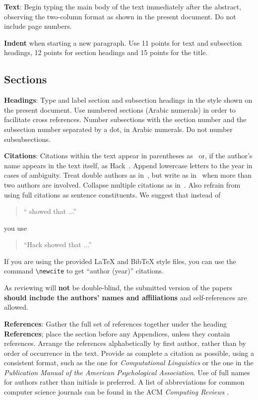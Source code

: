 \documentclass[11pt]{article}
\begin{document}
{\bf Text}: Begin typing the main body of the text immediately after
the abstract, observing the two-column format as shown in 
the present document. Do not include page numbers.

{\bf Indent} when starting a new paragraph. Use 11 points for text and 
subsection headings, 12 points for section headings and 15 points for
the title. 

\subsection{Sections}

{\bf Headings}: Type and label section and subsection headings in the
style shown on the present document.  Use numbered sections (Arabic
numerals) in order to facilitate cross references. Number subsections
with the section number and the subsection number separated by a dot,
in Arabic numerals. Do not number subsubsections.

{\bf Citations}: Citations within the text appear in parentheses
as~\cite{hack2011libera} or, if the author's name appears in the text
itself, as Hack~. Append lowercase letters
to the year in cases of ambiguity. Treat double authors as
in~\cite{jurafsky2012natural}, but write as in~\cite{cohn2020proceedings} when more than two authors are involved. Collapse multiple citations as
in~\cite{cohn2020proceedings,hack2011libera,jurafsky2012natural}. Also refrain from using full citations as sentence constituents. We suggest that instead of
\begin{quote}
  ``\cite{hack2011libera} showed that ...''
\end{quote}
you use
\begin{quote}
``Hack    showed that ...''
\end{quote}

If you are using the provided \LaTeX{} and Bib\TeX{} style files, you
can use the command \verb|\newcite| to get ``author (year)'' citations.

As reviewing will {\bf not} be double-blind, the submitted version of the 
papers {\bf should include the authors' names and affiliations} and self-references 
are allowed.

\textbf{References}: Gather the full set of references together under
the heading {\bf References}; place the section before any Appendices,
unless they contain references. Arrange the references alphabetically
by first author, rather than by order of occurrence in the text.
Provide as complete a citation as possible, using a consistent format,
such as the one for {\em Computational Linguistics\/} or the one in the 
{\em Publication Manual of the American 
Psychological Association\/}.  Use of full names for
authors rather than initials is preferred.  A list of abbreviations for common computer science journals can be found in the ACM 
{\em Computing Reviews} .
\end{document}
